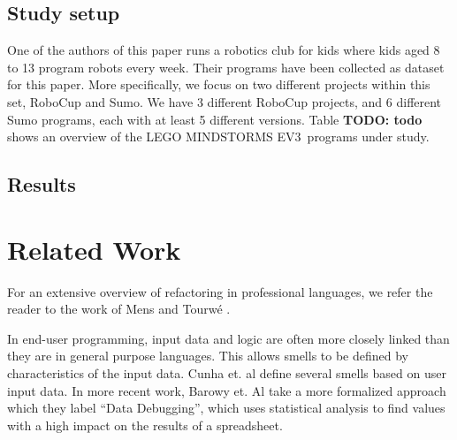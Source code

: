 \documentclass{sig-alternate}
\newcommand{\todo}[1]{\textbf{TODO: #1}}
\newcommand{\ms}{LEGO MINDSTORMS EV3}
\begin{document}
\subsection{Study setup}
One of the authors of this paper runs a robotics club for kids where kids aged 8 to 13 program robots every week. Their programs have been collected as dataset for this paper. More specifically, we focus on two different projects within this set, RoboCup and Sumo. We have 3 different RoboCup projects, and 6 different Sumo programs, each with at least 5 different versions. Table \todo{todo} shows an overview of the \ms~programs under study.

\subsection{Results}

\section{Related Work}

For an extensive overview of refactoring in professional languages, we refer the reader to the work of Mens and Tourw\'{e} \cite{mens2004survey}.

In end-user programming, input data and logic are often more closely linked than they are in general purpose languages.
This allows smells to be defined by characteristics of the input data.
Cunha et. al \cite{cunha2012towards} define several smells based on user input data.
In more recent work, Barowy et. Al \cite{barowy2014checkcell} take a  more formalized approach which they label ``Data Debugging'', which uses statistical analysis to find values with a high impact on the results of a spreadsheet.
\end{document}
